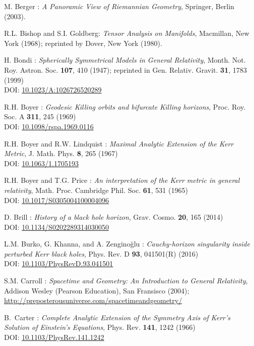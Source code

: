 \begin{thebibliography}{123}
M. Berger : {\em A Panoramic View of Riemannian Geometry},
Springer, Berlin (2003).

R.L. Bishop and S.I. Goldberg:
{\em Tensor Analysis on Manifolds},
Macmillan, New York (1968); reprinted by Dover, New York (1980).

H. Bondi :
{\em Spherically Symmetrical Models in General Relativity},
Month. Not. Roy. Astron. Soc. {\bf 107}, 410 (1947);
reprinted in
Gen. Relativ. Gravit. {\bf 31}, 1783 (1999)\\
DOI: \href{https://doi.org/10.1023/10.1023/A:1026726520289}{10.1023/A:1026726520289}

R.H. Boyer : {\em Geodesic Killing orbits and bifurcate Killing horizons},
Proc. Roy. Soc. A {\bf 311}, 245 (1969)\\
DOI: \href{https://doi.org/10.1098/rspa.1969.0116}{10.1098/rspa.1969.0116}

R.H. Boyer and R.W. Lindquist : {\em Maximal Analytic Extension of the Kerr Metric},
J. Math. Phys. {\bf 8}, 265 (1967)\\
DOI: \href{https://doi.org/10.1063/1.1705193}{10.1063/1.1705193}

R.H. Boyer and T.G. Price : {\em An interpretation of the Kerr metric in general relativity},
Math. Proc. Cambridge Phil. Soc. {\bf 61}, 531 (1965)\\
DOI: \href{https://doi.org/10.1017/S0305004100004096}{10.1017/S0305004100004096}

D. Brill : {\em History of a black hole horizon},
Grav. Cosmo. {\bf 20}, 165 (2014) \\
DOI: \href{https://doi.org/10.1134/S0202289314030050}{10.1134/S0202289314030050}

L.M. Burko, G. Khanna, and A. Zenginoğlu : {\em
Cauchy-horizon singularity inside perturbed Kerr black holes},
Phys. Rev. D {\bf 93}, 041501(R) (2016) \\
DOI: \href{https://doi.org/10.1103/PhysRevD.93.041501}{10.1103/PhysRevD.93.041501}

S.M. Carroll : \emph{Spacetime and Geometry: An Introduction to General Relativity},
Addison Wesley (Pearson Education), San Fransisco (2004); \\
\url{http://preposterousuniverse.com/spacetimeandgeometry/}

B.~Carter :
{\em Complete Analytic Extension of the Symmetry Axis of Kerr's Solution of Einstein's Equations},
Phys. Rev. {\bf 141}, 1242 (1966)\\
DOI: \href{https://doi.org/10.1103/PhysRev.141.1242}{10.1103/PhysRev.141.1242}


\end{thebibliography}
